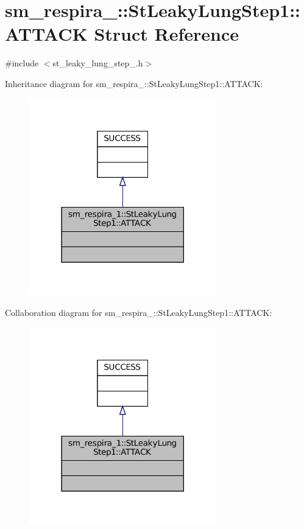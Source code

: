 \hypertarget{structsm__respira__1_1_1StLeakyLungStep1_1_1ATTACK}{}\section{sm\+\_\+respira\+\_\+:\+:St\+Leaky\+Lung\+Step1\+:\+:A\+T\+T\+A\+CK Struct Reference}
\label{structsm__respira__1_1_1StLeakyLungStep1_1_1ATTACK}


{\ttfamily \#include $<$st\+\_\+leaky\+\_\+lung\+\_\+step\+\_.\+h$>$}



Inheritance diagram for sm\+\_\+respira\+\_\+:\+:St\+Leaky\+Lung\+Step1\+:\+:A\+T\+T\+A\+CK\+:
\nopagebreak
\begin{figure}[H]
\begin{center}
\leavevmode
\includegraphics[width=230pt]{structsm__respira__1_1_1StLeakyLungStep1_1_1ATTACK__inherit__graph}
\end{center}
\end{figure}


Collaboration diagram for sm\+\_\+respira\+\_\+:\+:St\+Leaky\+Lung\+Step1\+:\+:A\+T\+T\+A\+CK\+:
\nopagebreak
\begin{figure}[H]
\begin{center}
\leavevmode
\includegraphics[width=230pt]{structsm__respira__1_1_1StLeakyLungStep1_1_1ATTACK__coll__graph}
\end{center}
\end{figure}


